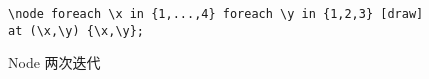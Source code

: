 \begin{itemize}
    \begin{figure}[H]
        \centering
        \begin{minipage}{0.35\linewidth}
            \centering
        \end{minipage}
        \begin{minipage}{0.55\linewidth}
            \begin{lstlisting}[style = latex-side]
    \node foreach \x in {1,...,4} foreach \y in {1,2,3} [draw] at (\x,\y) {\x,\y};
            \end{lstlisting}
        \end{minipage}
        \caption{Node 两次迭代}
    \end{figure}


\end{itemize}
